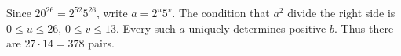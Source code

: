Since $20^{26}=2^{52}5^{26}$, write $a=2^u5^v$. The condition that $a^2$ divide the right side is $0\le u\le26$, $0\le v\le13$. Every such $a$ uniquely determines positive $b$. Thus there are $27\cdot14=\boxed{378}$ pairs.
